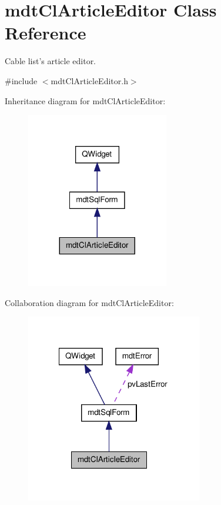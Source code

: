 \hypertarget{classmdt_cl_article_editor}{\section{mdt\-Cl\-Article\-Editor Class Reference}
\label{classmdt_cl_article_editor}
}


Cable list's article editor.  




{\ttfamily \#include $<$mdt\-Cl\-Article\-Editor.\-h$>$}



Inheritance diagram for mdt\-Cl\-Article\-Editor\-:
\nopagebreak
\begin{figure}[H]
\begin{center}
\leavevmode
\includegraphics[width=176pt]{classmdt_cl_article_editor__inherit__graph}
\end{center}
\end{figure}


Collaboration diagram for mdt\-Cl\-Article\-Editor\-:
\nopagebreak
\begin{figure}[H]
\begin{center}
\leavevmode
\includegraphics[width=218pt]{classmdt_cl_article_editor__coll__graph}
\end{center}
\end{figure}
